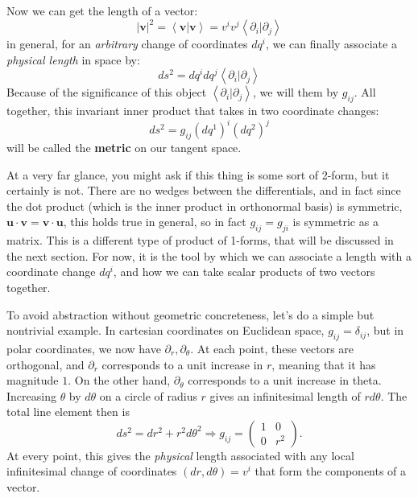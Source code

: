 	Now we can get the length of a vector:
	\begin{equation}
		|\mathbf v|^2 = \left< \mathbf v | \mathbf v \right> = v^i v^j \left< \partial_i | \partial_j \right> 
	\end{equation}
	in general, for an \emph{arbitrary} change of coordinates $dq^i$, we can finally associate a \emph{physical length} in space by:
	\begin{equation}
		ds^2 = dq^i dq^j  \left< \partial_i | \partial_j \right> 
	\end{equation}
	Because of the significance of this object $\left< \partial_i | \partial_j \right>$, we will them by $g_{ij}$. All together, this invariant inner product that takes in two coordinate changes:
	\begin{equation}
		ds^2 = g_{ij} {(dq^1)}^i {(dq^2)}^j 
	\end{equation}
	will be called the \textbf{metric} on our tangent space. 
	
	At a very far glance, you might ask if this thing is some sort of 2-form, but it certainly is not. There are no wedges between the differentials, and in fact since the dot product (which is the inner product in orthonormal basis) is symmetric, $\mathbf u \cdot \mathbf v = \mathbf v \cdot \mathbf u$, this holds true in general, so in fact $g_{ij} = g_{ji}$ is symmetric as a matrix. This is a different type of product of 1-forms, that will be discussed in the next section. For now, it is the tool by which we can associate a length with a coordinate change $dq^i$, and how we can take scalar products of two vectors together. 
	
	To avoid abstraction without geometric concreteness, let's do a simple but nontrivial example. In cartesian coordinates on Euclidean space, $g_{ij} = \delta_{ij}$, but in polar coordinates, we now have $\partial_r, \partial_\theta$. At each point, these vectors are orthogonal, and $\partial_r$ corresponds to a unit increase in $r$, meaning that it has magnitude $1$. On the other hand, $\partial_\theta$ corresponds to a unit increase in theta. Increasing $\theta$ by $d\theta$ on a circle of radius $r$ gives an infinitesimal length of $r d\theta$. The total line element then is
	\begin{equation}
		ds^2 = dr^2 + r^2 d\theta^2 \Rightarrow g_{ij} = 
		\begin{pmatrix}
			1 & 0 \\
			0 & r^2 
		\end{pmatrix}.
	\end{equation}
	At every point, this gives the \emph{physical} length associated with any local infinitesimal change of coordinates $(dr, d\theta) = v^i$ that form the components of a vector.
	
